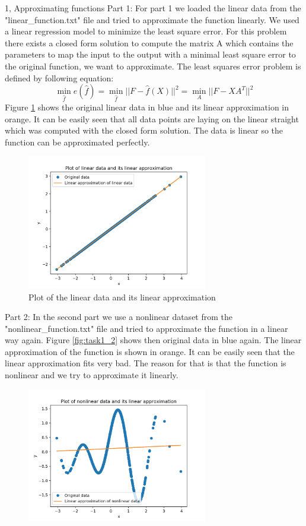 \documentclass[10pt,a4paper]{article}
\begin{document}
\frontpage

\begin{task}{1, Approximating functions}
Part 1: \bigbreak
For part 1 we loaded the linear data from the "linear\_function.txt" file and tried to approximate the function linearly. We used a linear regression model to minimize the least square error. For this problem there exists a closed form solution to compute the matrix A which contains the parameters to map the input to the output with a minimal least square error to the original function, we want to approximate. 
The least squares error problem is defined by following equation:
\begin{equation*}
\min_{\hat{f}}e(\hat{f}) = \min_{\hat{f}}||F-\hat{f}(X)||^2 = \min_{A}||F-XA^T||^2
\end{equation*}
Figure \ref{fig:task1_1} shows the original linear data in blue and its linear approximation in orange. It can be easily seen that all data points are laying on the linear straight which was computed with the closed form solution. The data is linear so the function can be approximated perfectly.
\begin{figure}[H]
\centering
\includegraphics[width=0.7\textwidth]{../plots/task1_part1.png}
\caption{Plot of the linear data and its linear approximation}
\label{fig:task1_1}
\end{figure}
Part 2:
In the second part we use a nonlinear dataset from the "nonlinear\_function.txt" file and tried to approximate the function in a linear way again.
Figure \ref{fig:task1_2} shows then original data in blue again. The linear approximation of the function is  shown in orange. It can be easily seen that the linear approximation fits very bad. The reason for that is that the function is nonlinear and we try to approximate it linearly.
\begin{figure}[H]
\centering
\includegraphics[width=0.7\textwidth]{../plots/task1_part2.png}

\end{figure}
\end{task}
\end{document}
